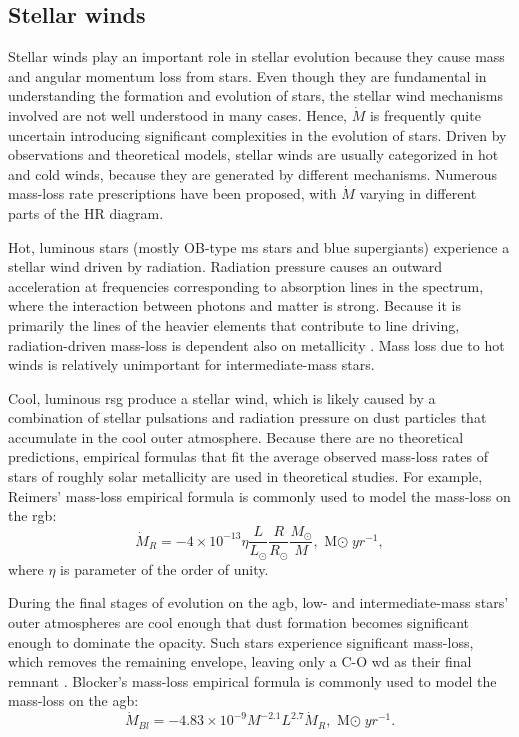 \subsection{Stellar winds}\label{sub:winds}

Stellar winds play an important role in stellar evolution because they cause mass and angular momentum loss from stars. Even though they are fundamental in understanding the formation and evolution of stars, the stellar wind mechanisms involved are not well understood in many cases. Hence, $\dot{M}$ is frequently quite uncertain introducing significant complexities in the evolution of stars. Driven by observations and theoretical models, stellar winds are usually categorized in hot and cold winds, because they are generated by different mechanisms. Numerous mass-loss rate prescriptions have been proposed, with $\dot{M}$ varying in different parts of the HR diagram.

Hot, luminous stars (mostly OB-type \ac{ms} stars and blue supergiants) experience a stellar wind driven by radiation. Radiation pressure causes an outward acceleration at frequencies corresponding to absorption lines in the spectrum, where the interaction between photons and matter is strong. Because it is primarily the lines of the heavier elements that contribute to line driving, radiation-driven mass-loss is dependent also on metallicity \citep{vink2001mass}. Mass loss due to hot winds is relatively unimportant for intermediate-mass stars.

Cool, luminous \ac{rsg} produce a stellar wind, which is likely caused by a combination of stellar pulsations and radiation pressure on dust particles that accumulate in the cool outer atmosphere. Because there are no theoretical predictions, empirical formulas that fit the average observed mass-loss rates of stars of roughly solar metallicity are used in theoretical studies. For example, Reimers' mass-loss empirical formula \citep{reimers1975circumstellar} is commonly used to model the mass-loss on the \ac{rgb}:
\begin{equation}\label{eq:reimer}
    \dot{M}_{R} = -4 \times 10^{-13} \eta 
    \frac{L}{L_{\odot}}  \frac{R}{R_{\odot}} \frac{M_{\odot}}{M},
    \text{ M${\odot} \; yr^{-1}$},
\end{equation}
where $\eta$ is parameter of the order of unity.

During the final stages of evolution on the \ac{agb}, low- and intermediate-mass stars' outer atmospheres are cool enough that dust formation becomes significant enough to dominate the opacity. Such stars experience significant mass-loss, which removes the remaining envelope, leaving only a C-O \ac{wd} as their final remnant \citep{marigo2007evolution, pols2011stellar}. Blocker's mass-loss empirical formula \citep{bloecker1995stellarI,bloecker1995stellarII} is commonly used to model the mass-loss on the \ac{agb}:
\begin{equation}\label{eq:blocker}
    \dot{M}_{Bl} = -4.83 \times 10^{-9} M^{-2.1} L^{2.7} \dot{M}_{R},
    \text{ M${\odot} \; yr^{-1}$}.
\end{equation}

